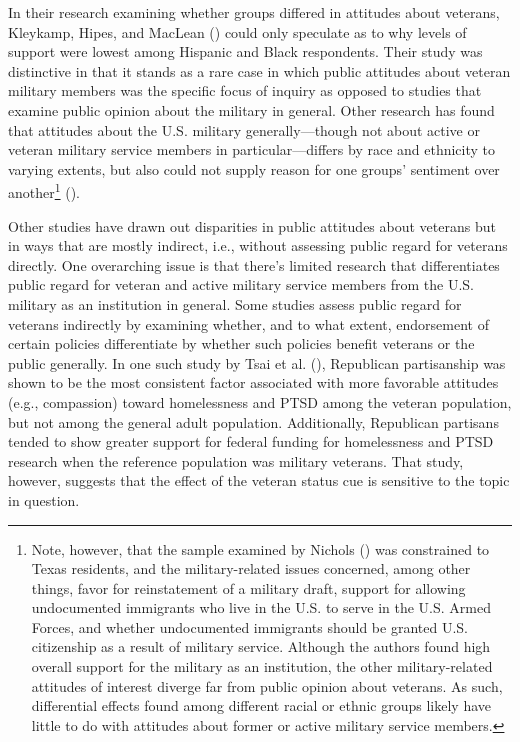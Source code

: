 \documentclass[
  12pt,
  letterpaper,
]{article}
\begin{document}
In their research examining whether groups differed in attitudes about
veterans, Kleykamp, Hipes, and MacLean
() could only speculate as to why
levels of support were lowest among Hispanic and Black respondents.
Their study was distinctive in that it stands as a rare case in which
public attitudes about veteran military members was the specific focus
of inquiry as opposed to studies that examine public opinion about the
military in general. Other research has found that attitudes about the
U.S. military generally---though not about active or veteran military
service members in particular---differs by race and ethnicity to varying
extents, but also could not supply reason for one groups' sentiment over
another\footnote{Note, however, that the sample examined by Nichols
  () was constrained to Texas residents,
  and the military-related issues concerned, among other things, favor
  for reinstatement of a military draft, support for allowing
  undocumented immigrants who live in the U.S. to serve in the U.S.
  Armed Forces, and whether undocumented immigrants should be granted
  U.S. citizenship as a result of military service. Although the authors
  found high overall support for the military as an institution, the
  other military-related attitudes of interest diverge far from public
  opinion about veterans. As such, differential effects found among
  different racial or ethnic groups likely have little to do with
  attitudes about former or active military service members.}
().

Other studies have drawn out disparities in public attitudes about
veterans but in ways that are mostly indirect, i.e., without assessing
public regard for veterans directly. One overarching issue is that
there's limited research that differentiates public regard for veteran
and active military service members from the U.S. military as an
institution in general. Some studies assess public regard for veterans
indirectly by examining whether, and to what extent, endorsement of
certain policies differentiate by whether such policies benefit veterans
or the public generally. In one such study by Tsai et al.
(), Republican partisanship was shown to be
the most consistent factor associated with more favorable attitudes
(e.g., compassion) toward homelessness and PTSD among the veteran
population, but not among the general adult population. Additionally,
Republican partisans tended to show greater support for federal funding
for homelessness and PTSD research when the reference population was
military veterans. That study, however, suggests that the effect of the
veteran status cue is sensitive to the topic in question.
\end{document}
